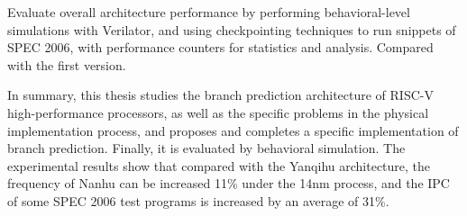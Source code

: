 {    Evaluate overall architecture performance by performing behavioral-level simulations with Verilator, and using checkpointing techniques to run snippets of SPEC 2006, with performance counters for statistics and analysis. Compared with the first version. 

    In summary, this thesis studies the branch prediction architecture of RISC-V high-performance processors, as well as the specific problems in the physical implementation process, and proposes and completes a specific implementation of branch prediction. Finally, it is evaluated by behavioral simulation. The experimental results show that compared with the Yanqihu architecture, the frequency of Nanhu can be increased 11\% under the 14nm process, and the IPC of some SPEC 2006 test programs is increased by an average of 31\%. 

}



\makeenabstract